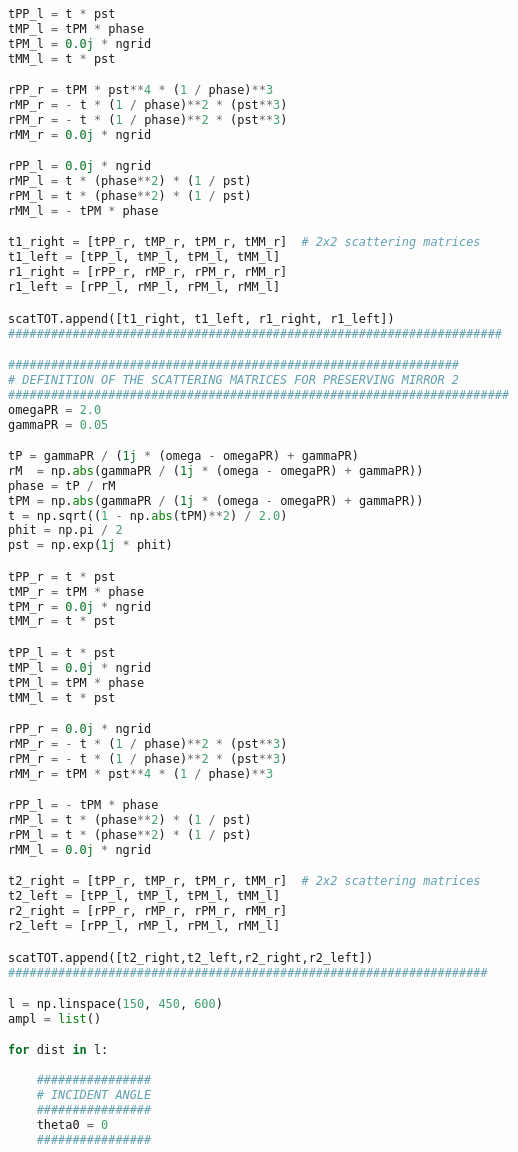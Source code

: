 \documentclass[showpacs,aps,prl,onecolumn,superscriptaddress]{revtex4-1}
\begin{document}
\begin{lstlisting}[language=Python, caption=Script for Figure \ref{LCPlcp}]
tPP_l = t * pst 
tMP_l = tPM * phase 
tPM_l = 0.0j * ngrid
tMM_l = t * pst 

rPP_r = tPM * pst**4 * (1 / phase)**3 
rMP_r = - t * (1 / phase)**2 * (pst**3) 
rPM_r = - t * (1 / phase)**2 * (pst**3) 
rMM_r = 0.0j * ngrid

rPP_l = 0.0j * ngrid
rMP_l = t * (phase**2) * (1 / pst)
rPM_l = t * (phase**2) * (1 / pst)
rMM_l = - tPM * phase

t1_right = [tPP_r, tMP_r, tPM_r, tMM_r]  # 2x2 scattering matrices
t1_left = [tPP_l, tMP_l, tPM_l, tMM_l]
r1_right = [rPP_r, rMP_r, rPM_r, rMM_r]
r1_left = [rPP_l, rMP_l, rPM_l, rMM_l]

scatTOT.append([t1_right, t1_left, r1_right, r1_left])
#####################################################################

###############################################################
# DEFINITION OF THE SCATTERING MATRICES FOR PRESERVING MIRROR 2
######################################################################
omegaPR = 2.0
gammaPR = 0.05

tP = gammaPR / (1j * (omega - omegaPR) + gammaPR)
rM  = np.abs(gammaPR / (1j * (omega - omegaPR) + gammaPR))
phase = tP / rM
tPM = np.abs(gammaPR / (1j * (omega - omegaPR) + gammaPR))
t = np.sqrt((1 - np.abs(tPM)**2) / 2.0)
phit = np.pi / 2
pst = np.exp(1j * phit)

tPP_r = t * pst
tMP_r = tPM * phase
tPM_r = 0.0j * ngrid
tMM_r = t * pst

tPP_l = t * pst
tMP_l = 0.0j * ngrid
tPM_l = tPM * phase
tMM_l = t * pst

rPP_r = 0.0j * ngrid
rMP_r = - t * (1 / phase)**2 * (pst**3) 
rPM_r = - t * (1 / phase)**2 * (pst**3) 
rMM_r = tPM * pst**4 * (1 / phase)**3

rPP_l = - tPM * phase
rMP_l = t * (phase**2) * (1 / pst)
rPM_l = t * (phase**2) * (1 / pst)
rMM_l = 0.0j * ngrid

t2_right = [tPP_r, tMP_r, tPM_r, tMM_r]  # 2x2 scattering matrices
t2_left = [tPP_l, tMP_l, tPM_l, tMM_l]
r2_right = [rPP_r, rMP_r, rPM_r, rMM_r]
r2_left = [rPP_l, rMP_l, rPM_l, rMM_l]

scatTOT.append([t2_right,t2_left,r2_right,r2_left])
###################################################################

l = np.linspace(150, 450, 600)
ampl = list()

for dist in l:
    
    ################
    # INCIDENT ANGLE
    ################
    theta0 = 0
    ################


\end{lstlisting}
\end{document}
